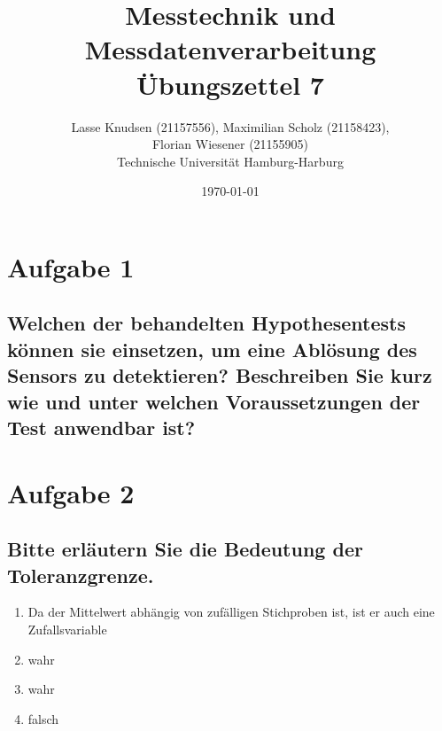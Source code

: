\documentclass[12pt, a4paper, titlepage]{article}
\title{Messtechnik und Messdatenverarbeitung \\ \"Ubungszettel 7}
\author{Lasse Knudsen (21157556), Maximilian Scholz (21158423), \\
	Florian Wiesener (21155905)  \\
	Technische Universit\"at Hamburg-Harburg \\
}
\date{\today}
\begin{document}
	\maketitle
	 \section{Aufgabe 1}
	 \label{sec:a1}
	 \subsection{Welchen der behandelten Hypothesentests k\"onnen sie einsetzen, um eine Abl\"osung des Sensors zu
	 	detektieren? Beschreiben Sie kurz wie und unter welchen Voraussetzungen der Test anwendbar ist?}
	
	\section{Aufgabe 2}

	\subsection{Bitte erl\"autern Sie die Bedeutung der Toleranzgrenze.}
	\begin{enumerate}
		\item Da der Mittelwert abh\"angig von zuf\"alligen Stichproben ist, ist er auch eine Zufallsvariable
		\item wahr
		\item wahr
		\item falsch
	\end{enumerate}
	
\end{document}
